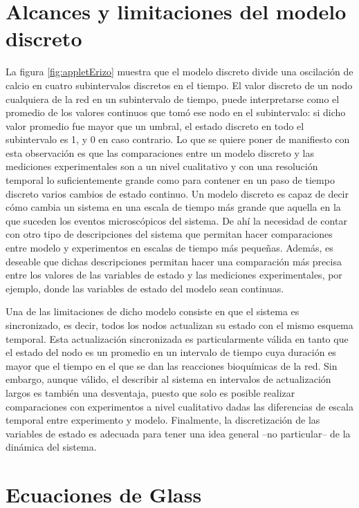 \section{Alcances y limitaciones del modelo discreto}

La figura \ref{fig:appletErizo} muestra que el modelo discreto divide una oscilación de calcio en cuatro subintervalos discretos en el tiempo. El valor discreto de un nodo cualquiera de la red en un subintervalo de tiempo, puede interpretarse como el promedio de los valores continuos que tomó ese nodo en el subintervalo: si dicho valor promedio fue mayor que un umbral, el estado discreto en todo el subintervalo es 1, y 0 en caso contrario. Lo que se quiere poner de manifiesto con esta observación es que las comparaciones entre un modelo discreto y las mediciones experimentales son a un nivel cualitativo y con una resolución temporal lo suficientemente grande como para contener en un paso de tiempo discreto varios cambios de estado continuo. Un modelo discreto es capaz de decir cómo cambia un sistema en una escala de tiempo más grande que aquella en la que suceden los eventos microscópicos del sistema. De ahí la necesidad de contar con otro tipo de descripciones del sistema que permitan hacer comparaciones entre modelo y experimentos en escalas de tiempo más pequeñas. Además, es deseable que dichas descripciones permitan hacer una comparación más precisa entre los valores de las variables de estado y las mediciones experimentales, por ejemplo, donde las variables de estado del modelo sean continuas.

Una de las limitaciones de dicho modelo consiste en que el sistema es sincronizado, es decir, todos los nodos actualizan su estado con el mismo esquema temporal. Esta actualización sincronizada es particularmente válida en tanto que el estado del nodo es un promedio en un intervalo de tiempo cuya duración es mayor que el tiempo en el que se dan las reacciones bioquímicas de la red. Sin embargo, aunque válido, el describir al sistema en intervalos de actualización largos es también una desventaja, puesto que solo es posible realizar comparaciones con experimentos a nivel cualitativo dadas las diferencias de escala temporal entre experimento y modelo. Finalmente, la discretización de las variables de estado es adecuada para tener una idea general --no particular-- de la dinámica del sistema. 

\section{Ecuaciones de Glass}

